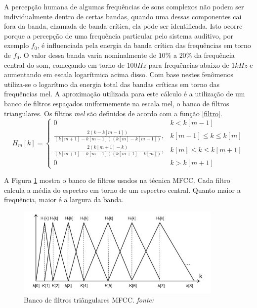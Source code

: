 A percepção humana de algumas frequências de sons complexos não podem ser individualmente dentro de certas bandas, quando uma dessas componentes cai fora da banda, chamada de banda crítica, ela pode ser identificada. Isto ocorre porque a percepção de uma frequência particular pelo sistema auditivo, por exemplo $f_0$, é influenciada pela energia da banda crítica das frequências em torno de $f_0$. O valor dessa banda varia nominalmente de $10 \%$ a $20 \%$ da frequência central do som, começando em torno de $100 Hz$ para frequências abaixo de $1 kHz$ e aumentando em escala logarítmica acima disso. Com base nestes fenômenos utiliza-se o logarítmo da energia total das bandas críticas em torno das frequências mel. A aproximação utilizada para este cálculo é a utilização de um banco de filtros espaçados uniformemente na escala mel, o banco de filtros triangulares. Os filtros \textit{mel} são definidos de acordo com a função \ref{filtro}.
\begin{equation}
\label{filtro}
H_m[k] = \left\{\begin{array}{ll}
0 & k < k[m-1]\\
\displaystyle \frac{2(k-k[m-1])}{(k[m+1]-k[m-1])(k[m]-k[m-1])}, & k[m-1] \leq k \leq k[m] \\
\displaystyle \frac{2(k[m+1]-k)}{(k[m+1]-k[m-1])(k[m+1]-k[m])}, & k[m] \leq k \leq k[m+1] \\
0 & k > k[m+1]\end{array} \right.
\end{equation}

A Figura \ref{fig:filtro} mostra o banco de filtros usados na técnica MFCC. Cada filtro calcula a média do espectro em torno de um espectro central. Quanto maior a frequência, maior é a largura da banda.

\begin{figure}[H]
\centering %
\includegraphics[width=10cm]{img/filtrotriangular.jpg} %
\caption{Banco de filtros triângulares MFCC. \textit{fonte: \cite{pucpncc}}}
\label{fig:filtro}
\end{figure}

